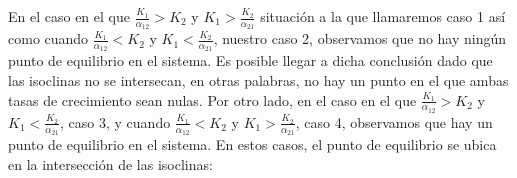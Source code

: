 \documentclass{article}
\begin{document}
 En el caso en el que \(\frac {K_1}{\alpha_12} > K_2\) y \(K_1 > \frac {K_2}{\alpha_{21}}\) situación a la que llamaremos caso 1 así como cuando 
\(\frac {K_1}{\alpha_12} < K_2\) y \(K_1 < \frac {K_2}{\alpha_{21}}\), nuestro caso 2, observamos que no hay ningún punto de equilibrio en el sistema. Es posible
llegar a dicha conclusión dado que las isoclinas no se intersecan, en otras palabras, no hay un punto en el que ambas tasas de crecimiento sean nulas. Por otro lado, 
en el caso en el que \(\frac {K_1}{\alpha_12} > K_2\) y \(K_1 < \frac {K_2}{\alpha_{21}}\), caso 3, y cuando \(\frac {K_1}{\alpha_12} < K_2\) y 
\(K_1 > \frac {K_2}{\alpha_{21}}\), caso 4, observamos que hay un punto de equilibrio en el sistema. En estos casos, el punto de equilibrio se ubica en la intersección
de las isoclinas:
\end{document}
